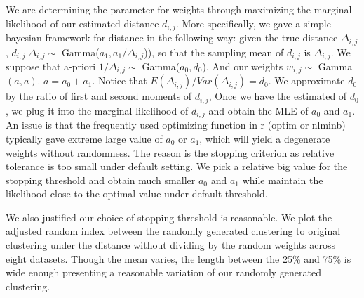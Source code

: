 \documentclass[aoas,preprint]{imsart}
\begin{document}
We are determining the parameter for weights through maximizing the marginal likelihood of our estimated distance $d_{i,j}$. More specifically, we gave a simple bayesian framework for distance in the following way:  given the true distance $\Delta_{i,j}$, $d_{i,j} | \Delta_{i,j} \sim$ Gamma($a_1, a_1 / \Delta_{i,j}$)), so that the sampling mean of $d_{i,j}$ is $\Delta_{i,j}$. We suppose that a-priori $1 / \Delta_{i,j} \sim$ Gamma($a_0, d_0$). And our weights $w_{i,j} \sim$ Gamma$(a, a)$. $a = a_0 + a_1$. Notice that $E(\Delta_{i,j}) / Var(\Delta_{i,j}) = d_0$. We approximate $d_0$ by the ratio of first and second moments of $d_{i,j}$, Once we have the estimated of $d_0$, we plug it into the marginal likelihood of $d_{i,j}$  and obtain the MLE of $a_0$ and $a_1$. An issue is that the frequently used optimizing function in r (optim or nlminb) typically gave extreme large value of $a_0$ or $a_1$, which will yield a degenerate weights without randomness. The reason is the stopping criterion as relative tolerance is too small under default setting. We pick a relative big value for the stopping threshold and obtain much smaller $a_0$ and $a_1$ while maintain the likelihood close to the optimal value under default threshold.

We also justified our choice of stopping threshold is reasonable. We plot the adjusted random index between the randomly generated clustering to original clustering under the distance without dividing by the random weights across eight datasets. Though the mean varies, the length between the 25\% and 75\% is wide enough presenting a reasonable variation of our randomly generated clustering.
\end{document}
